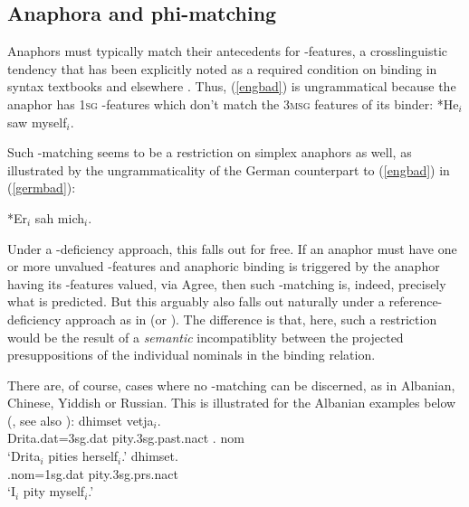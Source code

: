 \documentclass[output=paper, modfonts, nonflat]{langsci/langscibook}
\begin{document}
\subsection{Anaphora and phi-matching}

Anaphors must typically match their antecedents for \ph-features, a
crosslinguistic tendency that has been explicitly noted as a required
condition on binding in syntax textbooks and elsewhere
\citep{sagwasbend:2003, carnie:2007, heim:2008}. Thus, (\ref{engbad})
is ungrammatical because the anaphor has \textsc{1sg} \ph-features
which don't match the \textsc{3msg} features of its binder:
\ea\label{engbad} *He$_i$ saw myself$_i$.  \z

\noindent Such \ph-matching seems to be a restriction on simplex anaphors as
well, as illustrated by the ungrammaticality of the German counterpart
to (\ref{engbad}) in (\ref{germbad}):

\ea\label{germbad} *Er$_i$ sah mich$_i$.
\z

\noindent Under a \ph-deficiency approach, this falls out for free. If an
anaphor must have one or more unvalued \ph-features and anaphoric
binding is triggered by the anaphor having its \ph-features valued,
via Agree, then such \ph-matching is, indeed, precisely what is
predicted. But this arguably also falls out naturally under a
reference-deficiency approach as in \citet{Hicks:2009} (or
\citealt{adgerramchand:2005}). The difference is that, here, such a
restriction would be the result of a \emph{semantic} incompatiblity
between the projected presuppositions of the individual nominals in
the binding relation. 

There are, of course, cases where no \ph-matching can be discerned, as
in Albanian, Chinese, Yiddish or Russian. This is illustrated for the
Albanian examples below (\citealt[270-271]{woolford:1999}, see also
\citealt[91]{hubbard:1985}):
\ea\label{alb2} dhimset vetja$_i$.\\
Drita.{\sc dat=3sg.dat} pity.{\sc 3sg.past.nact} \anaph.{\sc
  nom}\\
\glt `Drita$_i$ pities herself$_i$.'
\ex\label{alb3} dhimset.\\
\anaph.{\sc nom=1sg.dat} pity.{\sc 3sg.prs.nact}\\
\glt `I$_i$ pity myself$_i$.'  \z
\end{document}
